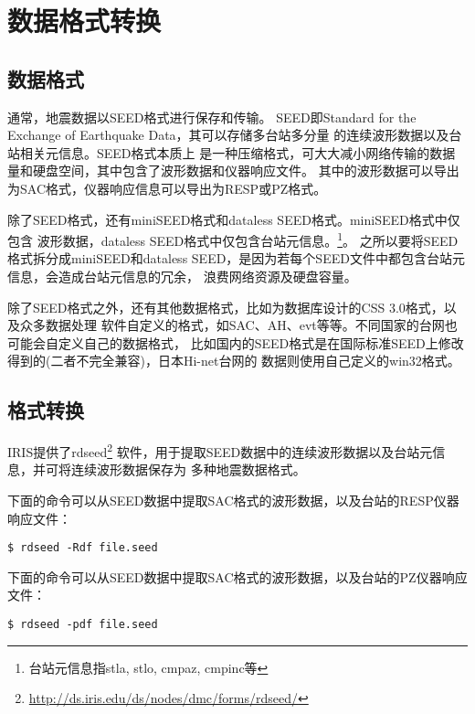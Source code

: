\section{数据格式转换}
\subsection{数据格式}
通常，地震数据以SEED格式进行保存和传输。
SEED即Standard for the Exchange of Earthquake Data，其可以存储多台站多分量
的连续波形数据以及台站相关元信息。SEED格式本质上
是一种压缩格式，可大大减小网络传输的数据量和硬盘空间，其中包含了波形数据和仪器响应文件。
其中的波形数据可以导出为SAC格式，仪器响应信息可以导出为RESP或PZ格式。

除了SEED格式，还有miniSEED格式和dataless SEED格式。miniSEED格式中仅包含
波形数据，dataless SEED格式中仅包含台站元信息。\footnote{台站元信息指stla, stlo, cmpaz, cmpinc等}。
之所以要将SEED格式拆分成miniSEED和dataless SEED，是因为若每个SEED文件中都包含台站元信息，会造成台站元信息的冗余，
浪费网络资源及硬盘容量。

除了SEED格式之外，还有其他数据格式，比如为数据库设计的CSS 3.0格式，以及众多数据处理
软件自定义的格式，如SAC、AH、evt等等。不同国家的台网也可能会自定义自己的数据格式，
比如国内的SEED格式是在国际标准SEED上修改得到的(二者不完全兼容)，日本Hi-net台网的
数据则使用自己定义的win32格式。

\subsection{格式转换}
IRIS提供了rdseed\footnote{\url{http://ds.iris.edu/ds/nodes/dmc/forms/rdseed/}}
软件，用于提取SEED数据中的连续波形数据以及台站元信息，并可将连续波形数据保存为
多种地震数据格式。

下面的命令可以从SEED数据中提取SAC格式的波形数据，以及台站的RESP仪器响应文件：
\begin{verbatim}
$ rdseed -Rdf file.seed
\end{verbatim}

下面的命令可以从SEED数据中提取SAC格式的波形数据，以及台站的PZ仪器响应文件：
\begin{verbatim}
$ rdseed -pdf file.seed
\end{verbatim}
